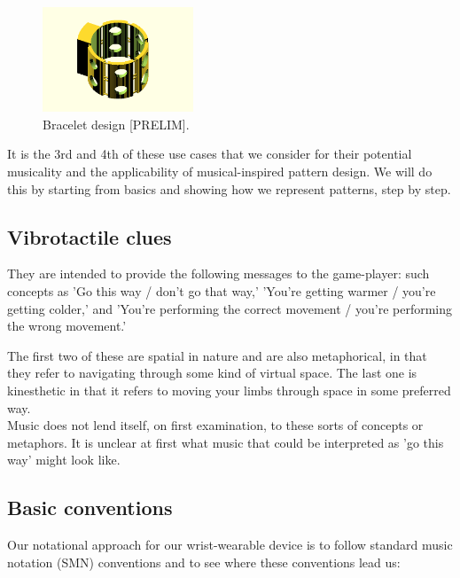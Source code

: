 \documentclass[a4paper, twocolumn]{article}
\begin{document}
\begin{figure}[htb]
    \begin{center}
        \includegraphics[width=0.4\textwidth]{graphics/bracelet-01.png}
    \end{center}
    \caption{Bracelet design [PRELIM].\label{fig:fig1}}
\end{figure}

It is the 3rd and 4th of these use cases that we consider for their potential musicality and the applicability of musical-inspired pattern design. We will do this by starting from basics and showing how we represent patterns, step by step.\\ 

\subsection{Vibrotactile clues}
They are intended to provide the following messages to the game-player:
such concepts as 'Go this way / don't go that way,'
'You're getting warmer / you're getting colder,' and 
'You're performing the correct movement / you're performing the wrong movement.'

The first two of these are spatial in nature and are also metaphorical, in that they refer to navigating through some kind of virtual space. The last one is kinesthetic in that it refers to moving your limbs through space in some preferred way.\\

Music does not lend itself, on first examination, to these sorts of concepts or metaphors. It is unclear at first what music that could be interpreted as 'go this way' might look like. 

\subsection{Basic conventions}
Our notational approach for our wrist-wearable device is to follow standard music notation (SMN) conventions and to see where these conventions lead us:
\end{document}
